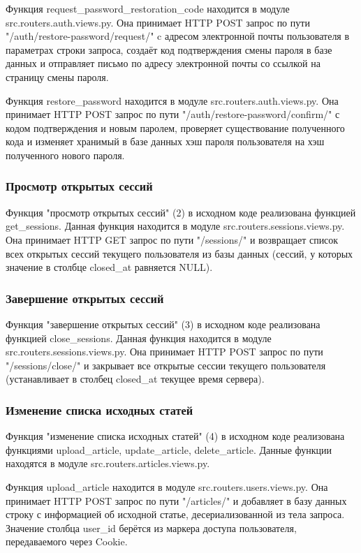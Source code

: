 \documentclass[14pt]{extarticle}
\begin{document}
Функция request\_password\_restoration\_code находится в модуле src.routers.auth.views.py. Она принимает HTTP POST запрос по пути "/auth/restore-password/request/" c адресом электронной почты пользователя в параметрах строки запроса, создаёт код подтверждения смены пароля в базе данных и отправляет письмо по адресу электронной почты со ссылкой на страницу смены пароля.

Функция restore\_password находится в модуле src.routers.auth.views.py. Она принимает HTTP POST запрос по пути "/auth/restore-password/confirm/" с кодом подтверждения и новым паролем, проверяет существование полученного кода и изменяет хранимый в базе данных хэш пароля пользователя на хэш полученного нового пароля.

\subsubsection{Просмотр открытых сессий}

Функция "просмотр открытых сессий" (2) в исходном коде реализована функцией get\_sessions. Данная функция находится в модуле src.routers.sessions.views.py. Она принимает HTTP GET запрос по пути "/sessions/" и возвращает список всех открытых сессий текущего пользователя из базы данных (сессий, у которых значение в столбце closed\_at равняется NULL).

\subsubsection{Завершение открытых сессий}

Функция "завершение открытых сессий" (3) в исходном коде реализована функцией close\_sessions. Данная функция находится в модуле src.routers.sessions.views.py. Она принимает HTTP POST запрос по пути "/sessions/close/" и закрывает все открытые сессии текущего пользователя (устанавливает в столбец closed\_at текущее время сервера).

\subsubsection{Изменение списка исходных статей}

Функция "изменение списка исходных статей" (4) в исходном коде реализована функциями upload\_article, update\_article, delete\_article. Данные функции находятся в модуле src.routers.articles.views.py.

Функция upload\_article находится в модуле src.routers.users.views.py. Она принимает HTTP POST запрос по пути "/articles/" и добавляет в базу данных строку с информацией об исходной статье, десериализованной из тела запроса. Значение столбца user\_id берётся из маркера доступа пользователя, передаваемого через Cookie.
\end{document}

